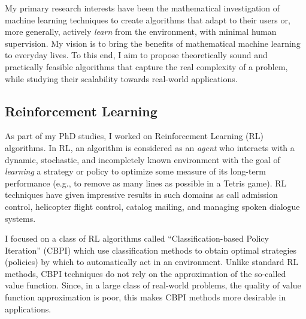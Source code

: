 My primary research interests have been the mathematical investigation of machine learning techniques to create algorithms that adapt to their users or, more generally, actively {\em learn} from the environment, with minimal human supervision. 
My vision is to bring the benefits of mathematical machine learning to everyday lives. To this end, 
I aim to propose theoretically sound and practically feasible algorithms that capture the real complexity of a problem, 
while studying their scalability towards real-world applications. 


\subsection{Reinforcement Learning} As part of my PhD studies, I worked on Reinforcement Learning (RL) algorithms. In RL, an algorithm is considered as an {\em agent} who interacts with a dynamic, stochastic, and
incompletely known environment with the goal of {\em learning} a strategy or policy to optimize some measure of its long-term performance (e.g., to remove as many lines as possible in a Tetris game). RL techniques have given impressive results in such domains as call admission control, helicopter flight control, catalog mailing, and managing spoken dialogue systems.
 
I focused on a class of RL algorithms called ``Classification-based Policy Iteration'' (CBPI) which use classification methods to obtain optimal strategies (policies) by which to automatically act in an environment. Unlike standard RL methods, CBPI techniques do not rely on the approximation of the so-called value function. Since, in a large class of real-world problems, the quality of value function approximation is poor, this makes CBPI methods more desirable in applications.

